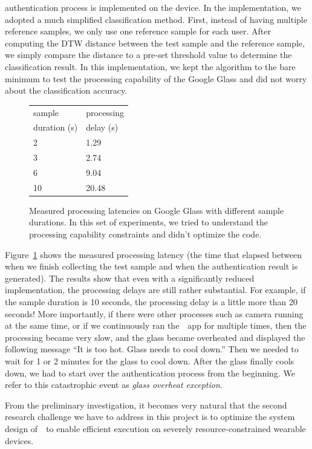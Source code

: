 authentication process is implemented on the device. In the implementation, we adopted a much simplified classification method. First, instead of having multiple reference samples, we only use one reference sample for each user. After computing the DTW distance between the test sample and the reference sample, we simply compare the distance to a pre-set threshold value to determine the classification result. In this implementation, we kept the algorithm to the bare minimum to test the processing capability of the Google Glass and did not worry about the classification accuracy.

\begin{figure}\centering
\small\centering
\begin{tabular}{|l|l|}\hline
sample  & processing \\
duration (s) & delay (s) \\\hline
2 & 1.29 \\\hline
3 & 2.74 \\\hline
6 & 9.04 \\\hline
10 & 20.48 \\\hline
\end{tabular}
\caption{\label{tab:glass}Measured processing latencies on Google Glass with different sample durations. In this set of experiments, we tried to understand the processing capability constraints and didn't optimize the code. }
\end{figure}
Figure~\ref{tab:glass} shows the measured processing latency (the time that elapsed between when we finish collecting the test sample and when the authentication result is generated). The results show that even with a significantly reduced implementation, the processing delays are still rather substantial. For example, if the sample duration is 10 seconds, the processing delay is a little more than 20 seconds! More importantly, if there were other processes such as camera running at the same time, or if we continuously ran the~\systemname~app for multiple times, then the processing became very slow, and the glass became overheated and displayed the following message ``It is too hot. Glass needs to cool down.'' Then we needed to wait for 1 or 2 minutes for the glass to cool down. After the glass finally cools down, we had to start over the authentication process from the beginning. We refer to this catastrophic event as \emph{glass overheat exception}.

From the preliminary investigation, it becomes very natural that the second research challenge we have to address in this project is to optimize the system design of~\systemname~to enable efficient execution on severely resource-constrained wearable devices.

